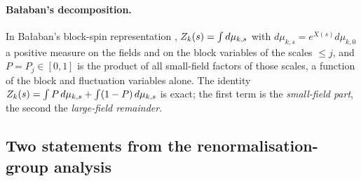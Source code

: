 \paragraph{Ba{\l}aban's decomposition.} In Ba{\l}aban's block-spin representation \cite{Ba1,Ba2}, $Z_{k}(s)=\int d\mu_{k,s}$ with $d\mu_{k,s}=e^{X(s)}d\mu_{k,0}$ a positive measure on the fields and on the block variables of the scales $\le j$, and $P=P_j\in[0,1]$ is the product of all small-field factors of those scales, a function of the block and fluctuation variables alone. The identity $Z_{k}(s)=\int P\,d\mu_{k,s}+\int(1-P)\,d\mu_{k,s}$ is exact; the first term is the \emph{small-field part}, the second the \emph{large-field remainder}.

\subsection{Two statements from the renormalisation-group analysis}\label{ssec:k01:open}


